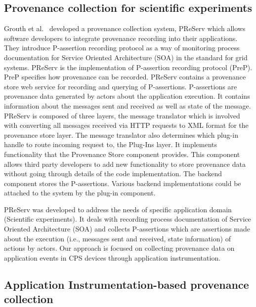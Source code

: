 \subsection{Provenance collection for scientific experiments}

Grouth et al.~\cite{groth} developed a provenance collection system, PReServ which allows software
developers to integrate provenance recording into their applications. They introduce
P-assertion recording protocol as a way of monitoring process documentation for Service
Oriented Architecture (SOA) in the standard for grid systems. PReServ is the implementation
of P-assertion recording protocol (PreP). PreP specifies how provenance can be
recorded. PReServ contains a provenance store web service for recording and querying of
P-assertions. P-assertions are provenance data generated by actors about the application
execution. It contains information about the messages sent and received as well as state of
the message. PReServ is composed of three layers, the message translator which is involved
with converting all messages received via HTTP requests to XML format for the provenance
store layer. The message translator also determines which plug-in handle to route incoming
request to, the Plug-Ins layer. It implements functionality that the Provenance Store component
provides. This component allows third party developers to add new functionality
to store provenance data without going through details of the code implementation. The
backend component stores the P-assertions. Various backend implementations could be
attached to the system by the plug-in component.

\par PReServ was developed to address the needs of specific application domain (Scientific experiments). It deals with recording process documentation of Service Oriented Architecture (SOA) and collects P-assertions which are assertions made about the execution (i.e., messages sent and received, state information) of actions by actors. Our approach is focused on collecting provenance data on application events in CPS devices through application instrumentation.




\subsection{Application Instrumentation-based provenance collection}

